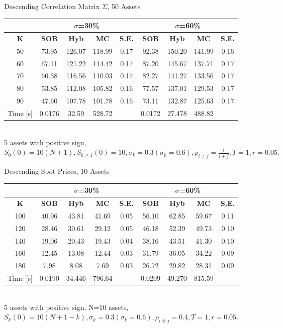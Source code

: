 \documentclass[a4paper]{article}
\begin{document}
\begin {table}
\caption {Descending Correlation Matrix $\Sigma$, 50 Assets} 
\begin{center}
\begin{tabular}{c|c c c  c|c c c c}
\hline
\multicolumn{1}{c|}{} & \multicolumn{4}{|c|}{$\sigma$=30\%} & \multicolumn{4}{|c}{$\sigma$=60\%} \\ 
\hline
  \textbf{K} & \textbf{SOB} & \textbf{Hyb}	& \textbf{MC}& \textbf{S.E.} & \textbf{SOB} & \textbf{Hyb} & \textbf{MC}& \textbf{S.E.} \\
50 &73.95&126.07&118.99&0.17& 92.38 &  150.20&141.99 &0.16  \\
60 &67.11&121.22&114.42&0.17& 87.20&  145.67&137.71 &0.17\\
70 &60.38&116.56&110.03&0.17& 82.27& 141.27 & 133.56 &0.17\\
80 &53.85&112.08&105.82& 0.16& 77.57& 137.01& 129.53 &0.17\\
90 &47.60&107.78&101.78& 0.16& 73.11&  132.87& 125.63 &0.17\\
\hline
Time [s] &0.0176 &32.59 &528.72 & &0.0172 &27.478&488.82 \\
\hline
\end{tabular}
\\[8pt]
\caption*{5 assets with positive sign, $S_0(0)=10(N+1), S_{k\geq1}(0) = 10, \sigma_k = 0.3 (\sigma_k = 0.6), \rho_{i\neq j} = \frac{1}{i+j}, T = 1, r=0.05.$}
\end{center}
\end{table}

\begin {table}
\caption {Descending Spot Prices, 10 Assets} 
\begin{center}
\begin{tabular}{c|c c c c|c c c c}
\hline
\multicolumn{1}{c|}{} & \multicolumn{4}{|c|}{$\sigma$=30\%} & \multicolumn{4}{|c}{$\sigma$=60\%} \\ 
\hline
  \textbf{K} & \textbf{SOB} & \textbf{Hyb}	& \textbf{MC}& \textbf{S.E.} & \textbf{SOB} & \textbf{Hyb} & \textbf{MC} & \textbf{S.E.} \\
100 &40.96&43.81&41.69& 0.05& 56.10& 62.85&59.67 & 0.11\\
120 &28.46&30.61& 29.12& 0.05&46.18& 52.39&49.73&0.10\\
140 &19.06&20.43& 19.43& 0.04& 38.16&43.51&41.30&0.10\\
160 &12.45&13.08& 12.44& 0.03 & 31.79&36.05& 34.22& 0.09 \\
180 &7.98& 8.08&7.69 & 0.03& 26.72&29.82&28.31&0.09\\
\hline
Time [s]& 0.0190&34.446& 796.64 & & 0.0209& 49.270&815.59 & \\
\hline
\end{tabular}
\\[8pt]
\caption*{5 assets with positive sign, N=10 assets, $S_k(0)=10(N+1-k), \sigma_k = 0.3 (\sigma_k = 0.6), \rho_{i\neq j} = 0.4, T = 1, r=0.05.$}
\end{center}
\end{table}
\end{document}
